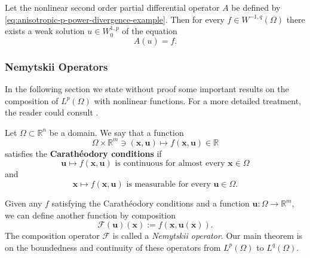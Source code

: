 \begin{Theorem}
\label{thm:anisotropic-p-power-dirichlet-existence}
Let the nonlinear second order partial differential operator $A$ be defined by \eqref{eq:anisotropic-p-power-divergence-example}. Then for every $f\in W^{-1,q}(\Omega)$ there exists a weak solution $u\in W_0^{1,p}$ of the equation
\begin{equation}\label{eq:anisotropic-p-power-dirichlet-existence-equation}
A(u)=f.
\end{equation}

\end{Theorem}

\subsubsection{Nemytskii Operators}\label{subsec:nemytskii-operators}

In the following section we state without proof some important results on the composition of $L^p(\Omega)$ with nonlinear functions. For a more detailed treatment, the reader could consult \cite{Li}.

\begin{Definition}
\label{def:caratheodory-conditions}
Let $\Omega\subset\mathbb{R}^n$ be a domain. We say that a function
\begin{equation}\label{eq:caratheodory-nonlinear-function-domain}
\Omega\times\mathbb{R}^m\ni(\bm{x},\bm{u})\mapsto f(\bm{x},\bm{u})\in\mathbb{R}
\end{equation}
satisfies the \textbf{Carathéodory conditions} if
\begin{equation}\label{eq:caratheodory-value-variable-continuity}
\bm{u}\mapsto f(\bm{x},\bm{u})\text{ is continuous for almost every }\bm{x}\in\Omega
\end{equation}
and
\begin{equation}\label{eq:caratheodory-spatial-measurability-printed-domain}
\bm{x}\mapsto f(\bm{x},\bm{u})\text{ is measurable for every }\bm{u}\in\Omega.
\end{equation}

\end{Definition}

Given any $f$ satisfying the Carathéodory conditions and a function $\bm{u}:\Omega\to\mathbb{R}^m$, we can define another function by composition
\begin{equation}\label{eq:nemytskii-pointwise-composition-operator}
\mathcal{F}(\bm{u})(\bm{x}):=f(\bm{x},\bm{u}(\bm{x})).
\end{equation}
The composition operator $\mathcal{F}$ is called a \emph{Nemytskii operator}. Our main theorem is on the boundedness and continuity of these operators from $L^p(\Omega)$ to $L^q(\Omega)$.

